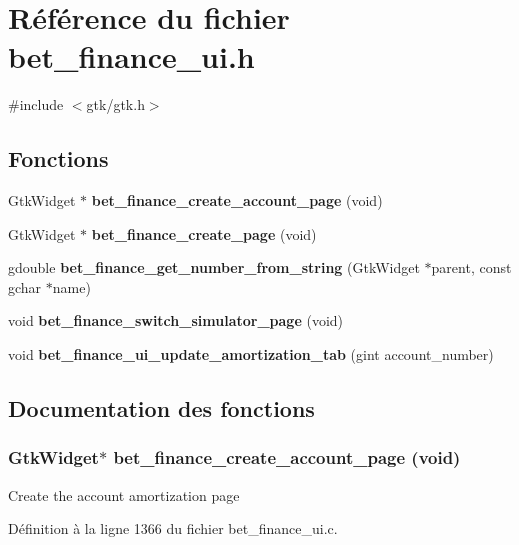 \section{Référence du fichier bet\_\-finance\_\-ui.h}
\label{bet__finance__ui_8h}
{\ttfamily \#include $<$gtk/gtk.h$>$}\par
\subsection*{Fonctions}
\begin{DoxyCompactItemize}
\item 
GtkWidget $\ast$ {\bf bet\_\-finance\_\-create\_\-account\_\-page} (void)
\item 
GtkWidget $\ast$ {\bf bet\_\-finance\_\-create\_\-page} (void)
\item 
gdouble {\bf bet\_\-finance\_\-get\_\-number\_\-from\_\-string} (GtkWidget $\ast$parent, const gchar $\ast$name)
\item 
void {\bf bet\_\-finance\_\-switch\_\-simulator\_\-page} (void)
\item 
void {\bf bet\_\-finance\_\-ui\_\-update\_\-amortization\_\-tab} (gint account\_\-number)
\end{DoxyCompactItemize}


\subsection{Documentation des fonctions}
\subsubsection[{bet\_\-finance\_\-create\_\-account\_\-page}]{\setlength{\rightskip}{0pt plus 5cm}GtkWidget$\ast$ bet\_\-finance\_\-create\_\-account\_\-page (void)}\label{bet__finance__ui_8h_a96bad4699d87b533c1c4f2f51f285e2a}
Create the account amortization page 

Définition à la ligne 1366 du fichier bet\_\-finance\_\-ui.c.

